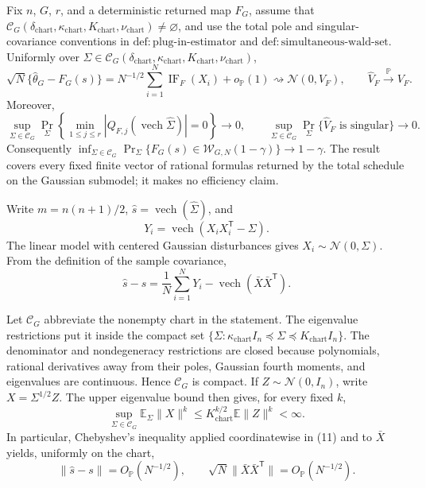 Fix \(n\), \(G\), \(r\), and a deterministic returned map \(F_G\), assume that \(\mathcal C_G(\delta_{\mathrm{chart}},\kappa_{\mathrm{chart}},K_{\mathrm{chart}},\nu_{\mathrm{chart}})\neq\varnothing\), and use the total pole and singular-covariance conventions in \(\mathrm{def:plug\mbox{-}in\mbox{-}estimator}\) and \(\mathrm{def:simultaneous\mbox{-}wald\mbox{-}set}\). Uniformly over \(\Sigma\in\mathcal C_G(\delta_{\mathrm{chart}},\kappa_{\mathrm{chart}},K_{\mathrm{chart}},\nu_{\mathrm{chart}})\),
\[
\sqrt N\{\widehat\theta_G-F_G(s)\}=N^{-1/2}\sum_{i=1}^N\operatorname{IF}_F(X_i)+o_{\mathbb P}(1)\rightsquigarrow\mathcal N(0,V_F),\qquad \widehat V_F\xrightarrow{\mathbb P}V_F.
\]
Moreover,
\[
\sup_{\Sigma\in\mathcal C_G}\Pr_{\Sigma}\!\left\{\min_{1\le j\le r}|Q_{F,j}(\operatorname{vech}\widehat\Sigma)|=0\right\}\to0,\qquad \sup_{\Sigma\in\mathcal C_G}\Pr_{\Sigma}\{\widehat V_F\text{ is singular}\}\to0.
\]
Consequently \(\inf_{\Sigma\in\mathcal C_G}\Pr_{\Sigma}\{F_G(s)\in\mathcal W_{G,N}(1-\gamma)\}\to1-\gamma\). The result covers every fixed finite vector of rational formulas returned by the total schedule on the Gaussian submodel; it makes no efficiency claim.

Write \(m=n(n+1)/2\), \(\widehat s=\operatorname{vech}(\widehat\Sigma)\), and
\[
 Y_i=\operatorname{vech}(X_iX_i^{\mathsf T}-\Sigma).
\]
The linear model with centered Gaussian disturbances gives \(X_i\sim\mathcal N(0,\Sigma)\).  From the definition of the sample covariance,
\[
 \widehat s-s=\frac1N\sum_{i=1}^N Y_i-\operatorname{vech}(\bar X\bar X^{\mathsf T}). \tag{11}
\]

Let \(\mathcal C_G\) abbreviate the nonempty chart in the statement.  The eigenvalue restrictions put it inside the compact set \(\{\Sigma:\kappa_{\mathrm{chart}}I_n\preceq\Sigma\preceq K_{\mathrm{chart}}I_n\}\).  The denominator and nondegeneracy restrictions are closed because polynomials, rational derivatives away from their poles, Gaussian fourth moments, and eigenvalues are continuous.  Hence \(\mathcal C_G\) is compact.  If \(Z\sim\mathcal N(0,I_n)\), write \(X=\Sigma^{1/2}Z\).  The upper eigenvalue bound then gives, for every fixed \(k\),
\[
 \sup_{\Sigma\in\mathcal C_G}\mathbb E_\Sigma\|X\|^k
 \leq K_{\mathrm{chart}}^{k/2}\mathbb E\|Z\|^k<\infty. \tag{12}
\]
In particular, Chebyshev's inequality applied coordinatewise in (11) and to \(\bar X\) yields, uniformly on the chart,
\[
 \|\widehat s-s\|=O_{\mathbb P}(N^{-1/2}),\qquad
 \sqrt N\|\bar X\bar X^{\mathsf T}\|=O_{\mathbb P}(N^{-1/2}). \tag{13}
\]


